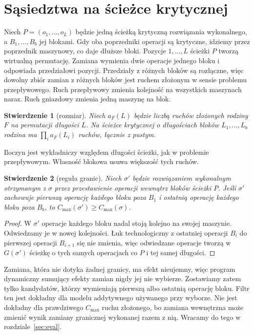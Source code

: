 \documentclass[10pt,twocolumn]{article}
\newtheorem{proposition}{Stwierdzenie}
\newcommand{\Cmax}{C_{\max}}
\begin{document}
\section{Sąsiedztwa na ścieżce krytycznej}\label{sec:family}

Niech $P=(o_1,\dots,o_L)$ będzie jedną ścieżką krytyczną rozwiązania
wykonalnego, a $B_1,\dots,B_b$ jej blokami. Gdy oba poprzedniki operacji
są krytyczne, idziemy przez poprzednik maszynowy, co daje dłuższe bloki.
Pozycje $1,\dots,L$ ścieżki $P$ tworzą wirtualną permutację. Zamiana
wymienia dwie operacje jednego bloku i odpowiada przedziałowi pozycji.
Przedziały z różnych bloków są rozłączne, więc dowolny zbiór zamian
z różnych bloków jest ruchem złożonym w sensie problemu przepływowego.
Ruch przepływowy zmienia kolejność na wszystkich maszynach naraz. Ruch
gniazdowy zmienia jedną maszynę na blok.

\begin{proposition}[rozmiar]\label{pr:count}
Niech $a_F(L)$ będzie liczbą ruchów złożonych rodziny $F$ na permutacji
długości $L$. Na ścieżce krytycznej o długościach bloków $L_1,\dots,L_b$
rodzina ma $\prod_{i} a_F(L_i)$ ruchów, łącznie z pustym.
\end{proposition}

Iloczyn jest wykładniczy względem długości ścieżki, jak w problemie
przepływowym. Własność blokowa usuwa większość tych ruchów.

\begin{proposition}[reguła granic]\label{pr:border}
Niech $\sigma'$ będzie rozwiązaniem wykonalnym otrzymanym z $\sigma$
przez przestawienie operacji wewnątrz bloków ścieżki $P$. Jeśli $\sigma'$
zachowuje pierwszą operację każdego bloku poza $B_1$ i ostatnią operację
każdego bloku poza $B_b$, to $\Cmax(\sigma')\ge\Cmax(\sigma)$.
\end{proposition}
\begin{proof}
W $\sigma'$ operacje każdego bloku nadal stoją kolejno na swojej
maszynie. Odwiedzamy je w nowej kolejności. Łuk technologiczny z ostatniej
operacji $B_i$ do pierwszej operacji $B_{i+1}$ się nie zmienia, więc
odwiedzane operacje tworzą w $G(\sigma')$ ścieżkę o tych samych
operacjach co $P$ i tej samej długości.
\end{proof}

Zamiana, która nie dotyka żadnej granicy, ma efekt nieujemny, więc
program dynamiczny sumujący efekty zamian nigdy jej nie wybierze.
Zostawiamy zatem tylko kandydatów, którzy wymieniają pierwszą albo
ostatnią operację bloku. Filtr ten jest dokładny dla modelu addytywnego
używanego przy wyborze. Nie jest dokładny dla prawdziwego $\Cmax$ ruchu
złożonego, bo zamiana wewnętrzna może zmienić wynik zamiany granicznej
wykonanej razem z nią. Wracamy do tego w rozdziale~\ref{sec:eval}.
\end{document}
